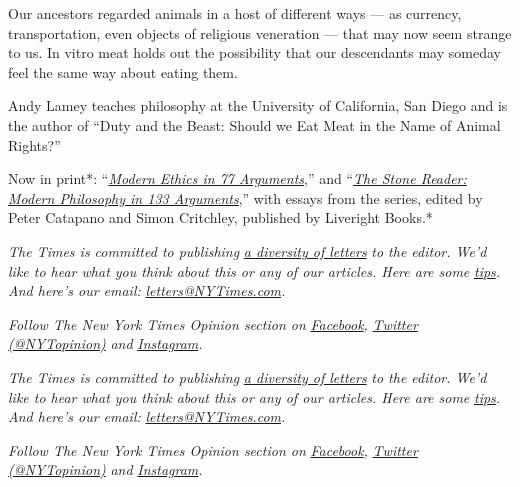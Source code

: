 Our ancestors regarded animals in a host of different ways --- as
currency, transportation, even objects of religious veneration --- that
may now seem strange to us. In vitro meat holds out the possibility that
our descendants may someday feel the same way about eating them.

Andy Lamey teaches philosophy at the University of California, San Diego
and is the author of ``Duty and the Beast: Should we Eat Meat in the
Name of Animal Rights?''

Now in print*: ``\emph{\href{http://bitly.com/1MW2kN3}{\emph{Modern
Ethics in 77 Arguments}}},'' and
``\emph{\href{http://bitly.com/1MW2kN3}{\emph{The Stone Reader: Modern
Philosophy in 133 Arguments}}},'' with essays from the series, edited by
Peter Catapano and Simon Critchley, published by Liveright Books.*

\emph{The Times is committed to publishing}
\href{https://www.nytimes3xbfgragh.onion/2019/01/31/opinion/letters/letters-to-editor-new-york-times-women.html}{\emph{a
diversity of letters}} \emph{to the editor. We'd like to hear what you
think about this or any of our articles. Here are some}
\href{https://help.nytimes3xbfgragh.onion/hc/en-us/articles/115014925288-How-to-submit-a-letter-to-the-editor}{\emph{tips}}\emph{.
And here's our email:}
\href{mailto:letters@NYTimes.com}{\emph{letters@NYTimes.com}}\emph{.}

\emph{Follow The New York Times Opinion section on}
\href{https://www.facebookcorewwwi.onion/nytopinion}{\emph{Facebook}}\emph{,}
\href{http://twitter.com/NYTOpinion}{\emph{Twitter (@NYTopinion)}}
\emph{and}
\href{https://www.instagram.com/nytopinion/}{\emph{Instagram}}\emph{.}

\emph{The Times is committed to publishing}
\href{https://www.nytimes3xbfgragh.onion/2019/01/31/opinion/letters/letters-to-editor-new-york-times-women.html}{\emph{a
diversity of letters}} \emph{to the editor. We'd like to hear what you
think about this or any of our articles. Here are some}
\href{https://help.nytimes3xbfgragh.onion/hc/en-us/articles/115014925288-How-to-submit-a-letter-to-the-editor}{\emph{tips}}\emph{.
And here's our email:}
\href{mailto:letters@NYTimes.com}{\emph{letters@NYTimes.com}}\emph{.}

\emph{Follow The New York Times Opinion section on}
\href{https://www.facebookcorewwwi.onion/nytopinion}{\emph{Facebook}}\emph{,}
\href{http://twitter.com/NYTOpinion}{\emph{Twitter (@NYTopinion)}}
\emph{and}
\href{https://www.instagram.com/nytopinion/}{\emph{Instagram}}\emph{.}

